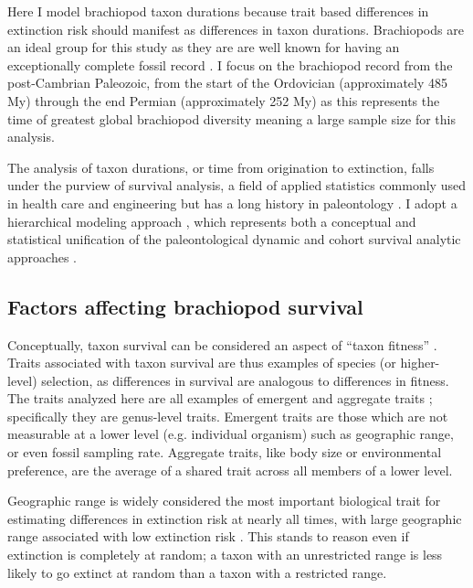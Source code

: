 \documentclass{article}
\begin{document}
Here I model brachiopod taxon durations because trait based differences in extinction risk should manifest as differences in taxon durations. Brachiopods are an ideal group for this study as they are are well known for having an exceptionally complete fossil record \citep{Foote1996e,Foote2000a}. I focus on the brachiopod record from the post-Cambrian Paleozoic, from the start of the Ordovician (approximately 485 My) through the end Permian (approximately 252 My) as this represents the time of greatest global brachiopod diversity \citep{Alroy2010} meaning a large sample size for this analysis.

The analysis of taxon durations, or time from origination to extinction, falls under the purview of survival analysis, a field of applied statistics commonly used in health care and engineering \citep{Klein2003} but has a long history in paleontology \citep{Simpson1944,Simpson1953,VanValen1973,VanValen1979,Smits2015,Crampton2016}. I adopt a hierarchical modeling approach \citep{Gelman2007,Gelman2013d,Klein2003}, which represents both a conceptual and statistical unification of the paleontological dynamic and cohort survival analytic approaches \citep{VanValen1973,VanValen1979,Raup1978,Raup1975,Foote1988,Baumiller1993,Simpson2006,Smits2015,Crampton2016,Ezard2012b}. 

\subsection{Factors affecting brachiopod survival}

Conceptually, taxon survival can be considered an aspect of ``taxon fitness'' \citep{Cooper1984,Palmer2012}. Traits associated with taxon survival are thus examples of species (or higher-level) selection, as differences in survival are analogous to differences in fitness. The traits analyzed here are all examples of emergent and aggregate traits \citep{Jablonski2008a,Rabosky2010b}; specifically they are genus-level traits. Emergent traits are those which are not measurable at a lower level (e.g. individual organism) such as geographic range, or even fossil sampling rate. Aggregate traits, like body size or environmental preference, are the average of a shared trait across all members of a lower level.

Geographic range is widely considered the most important biological trait for estimating differences in extinction risk at nearly all times, with large geographic range associated with low extinction risk \citep{Jablonski1986,Jablonski1987,Jablonski2003,Payne2007,Jablonski2008a,Harnik2013,Finnegan2012a}. This stands to reason even if extinction is completely at random; a taxon with an unrestricted range is less likely to go extinct at random than a taxon with a restricted range. %
\end{document}
